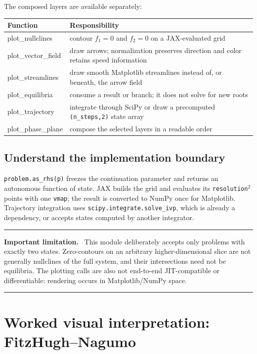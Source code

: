 \documentclass[11pt,oneside]{book}
\newenvironment{warningbox}
  {\par\medskip\noindent\begin{minipage}{\textwidth}
   \color{JaxRed}\rule{\textwidth}{0.8pt}\par
   \textbf{Important limitation.}\ \color{black}}
  {\par\color{JaxRed}\rule{\textwidth}{0.8pt}
   \end{minipage}\par\medskip}
\begin{document}
The composed layers are available separately:

\noindent\begin{tabularx}{\textwidth}{>{\ttfamily}p{}X}
\toprule
\normalfont Function & Responsibility\\
\midrule
plot\_nullclines & contour $f_1=0$ and $f_2=0$ on a JAX-evaluated grid\\
plot\_vector\_field & draw arrows; normalization preserves direction and color
retains speed information\\
plot\_streamlines & draw smooth Matplotlib streamlines instead of, or beneath,
the arrow field\\
plot\_equilibria & consume a result or branch; it does not solve for new roots\\
plot\_trajectory & integrate through SciPy or draw a precomputed
\texttt{(n\_steps,2)} state array\\
plot\_phase\_plane & compose the selected layers in a readable order\\
\bottomrule
\end{tabularx}

\subsection{Understand the implementation boundary}

\texttt{problem.as\_rhs(p)} freezes the continuation parameter and returns an
autonomous function of state. JAX builds the grid and evaluates its
\texttt{resolution}$^2$ points with one \texttt{vmap}; the result is converted
to NumPy once for Matplotlib. Trajectory integration uses
\texttt{scipy.integrate.solve\_ivp}, which is already a dependency, or accepts
states computed by another integrator.

\begin{warningbox}
This module deliberately accepts only problems with exactly two states.
Zero-contours on an arbitrary higher-dimensional slice are not generally
nullclines of the full system, and their intersections need not be
equilibria. The plotting calls are also not end-to-end JIT-compatible or
differentiable: rendering occurs in Matplotlib/NumPy space.
\end{warningbox}

\section{Worked visual interpretation: FitzHugh--Nagumo}
\end{document}
